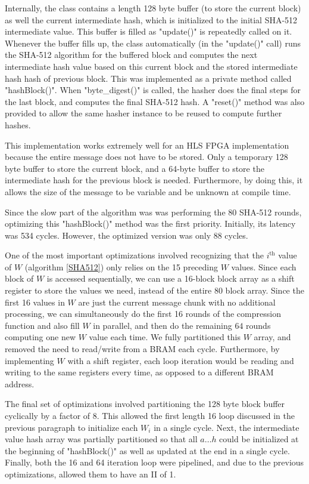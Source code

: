 Internally, the class contains a length 128 byte buffer (to store the current block)
as well the current intermediate hash,
which is initialized to the initial SHA-512 intermediate value. This buffer is filled as
"update()" is repeatedly called on it. Whenever the buffer fills up, the class
automatically (in the "update()" call) runs the SHA-512 algorithm for the buffered block
and computes the next intermediate hash value based on this current block and the stored intermediate hash hash of previous block.
This was implemented as a private method called "hashBlock()".
When "byte_digest()" is called, the hasher does the final steps for the last block,
and computes the final SHA-512 hash. A "reset()" method was also provided to allow the same hasher
instance to be reused to compute further hashes.

This implementation works extremely well for an HLS FPGA implementation because
the entire message does not have to be stored. Only a temporary 128 byte buffer
to store the current block, and a 64-byte buffer to store the intermediate hash for the previous block is needed.
Furthermore, by doing this, it allows the size of the message to be variable and be unknown at compile time.

Since the slow part of the algorithm was was performing the 80 SHA-512 rounds,
optimizing this "hashBlock()" method was the first priority. Initially, its
latency was 534 cycles. However, the optimized version was only 88 cycles.

One of the most important optimizations
involved recognizing that the $i^{\text{th}}$ value of $W$ (algorithm \ref{SHA512}) only relies on the 15 preceding $W$ values.
Since each block of $W$ is accessed sequentially, we can use a 16-block block array as a shift register
to store the values we need, instead of the entire 80 block array. Since the first 16 values in $W$ are
just the current message chunk with no additional processing, we can simultaneously do the first 16
rounds of the compression function and also fill $W$ in parallel, and then do the remaining $64$ rounds
computing one new $W$ value each time. We fully partitioned this $W$ array, and removed the need
to read/write from a BRAM each cycle. Furthermore, by implementing $W$ with a shift register,
each loop iteration would be reading and writing to the same registers every time,
as opposed to a different BRAM address.

The final set of optimizations involved partitioning the 128 byte block buffer
cyclically by a factor of 8. This allowed the first length 16 loop discussed
in the previous paragraph to initialize each $W_i$ in a single cycle. Next, the
intermediate value hash array was partially partitioned so that all $a \ldots h$ could
be initialized at the beginning of "hashBlock()" as well as updated
at the end in a single cycle. Finally, both the 16 and 64 iteration loop were
pipelined, and due to the previous optimizations, allowed them to have an II of 1.

